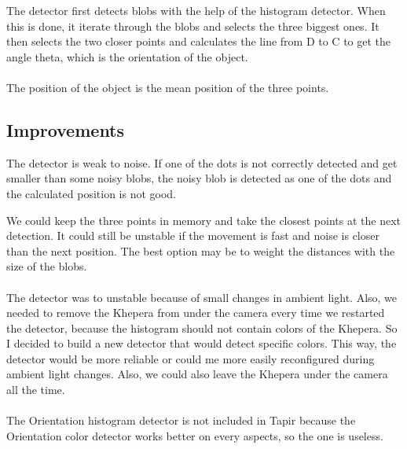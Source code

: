  
    The detector first detects blobs with the help of the histogram 
    detector. When this is done, it iterate through the blobs and selects 
    the three biggest ones.  It then selects the two closer points and 
    calculates the line from D to C to get the angle theta, which is the 
    orientation of the object.
   \\
    \\
    The position of the object is the mean position of the three points.

\subsection{Improvements}

    The detector is weak to noise. If one of the dots is not correctly 
    detected and get smaller than some noisy blobs, the noisy blob is 
    detected as one of the dots and the calculated position is not 
    good.

    We could keep the three points in memory and take the closest points 
    at the next detection. It could still be unstable if the movement is 
    fast and noise is closer than the next position. The best option may 
    be to weight the distances with the size of the blobs. 
    \\
    \\
    The detector was to unstable because of small changes in ambient light.
    Also, we needed to remove the Khepera from under the camera every time 
    we restarted the detector, because the histogram should not contain 
    colors of the Khepera. So I decided to build a new detector that would 
    detect specific colors. This way, the detector would be more reliable 
    or could me more easily reconfigured during ambient light changes. 
    Also, we could also leave the Khepera under the camera all the time. 
    \\
    \\
    The Orientation histogram detector is not included in Tapir because 
    the Orientation color detector works better on every aspects, so the 
    one is useless.


